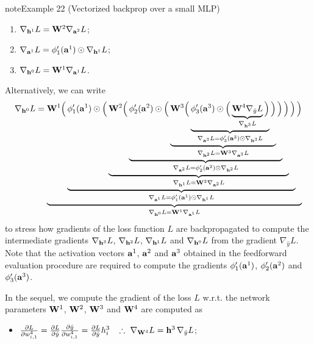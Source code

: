 \documentclass[letterpaper,10pt,english]{jupyterBook}
\begin{document}
\begin{sphinxadmonition}{note}{Example 22 (Vectorized backprop over a small MLP)}
\begin{enumerate}
\item {} 
\sphinxAtStartPar
\(\nabla_{{\bf h}^1} L = \mathbf{W}^2 \nabla_{\mathbf{a}^2} L\);

\item {} 
\sphinxAtStartPar
\(\nabla_{\mathbf{a}^1} L = \phi_{1}'(\mathbf{a}^1) \odot \nabla_{{\bf h}^1} L\);

\item {} 
\sphinxAtStartPar
\(\nabla_{{\bf h}^0} L = \mathbf{W}^1 \nabla_{\mathbf{a}^1} L\).

\end{enumerate}

\sphinxAtStartPar
Alternatively, we can write
\begin{equation*}
\begin{split}
\nabla_{{\bf h}^0} L = \underbrace{\mathbf{W}^1 \Big( 
\underbrace{\phi_{1}'(\mathbf{a}^1) \odot \Big(
\underbrace{\mathbf{W}^2 \Big( 
\underbrace{\phi_{2}'(\mathbf{a}^2) \odot \Big(
\underbrace{\mathbf{W}^3 \Big(
\underbrace{\phi_{3}'(\mathbf{a}^3) \odot \Big(
\underbrace{\mathbf{W}^4 \nabla_{\hat{y}} L}_{\nabla_{{\bf h}^3} L}
\Big)}_{\nabla_{\mathbf{a}^3} L = \phi_{3}'(\mathbf{a}^3) \odot \nabla_{{\bf h}^3} L}
\Big)}_{\nabla_{{\bf h}^2} L = \mathbf{W}^3 \nabla_{\mathbf{a}^3} L}
\Big)}_{\nabla_{\mathbf{a}^2} L = \phi_{2}'(\mathbf{a}^2) \odot \nabla_{{\bf h}^2} L}
\Big)}_{\nabla_{{\bf h}^1} L = \mathbf{W}^2 \nabla_{\mathbf{a}^2} L}
\Big)}_{\nabla_{\mathbf{a}^1} L = \phi_{1}'(\mathbf{a}^1) \odot \nabla_{{\bf h}^1} L}
\Big)}_{\nabla_{{\bf h}^0} L = \mathbf{W}^1 \nabla_{\mathbf{a}^1} L}
\end{split}
\end{equation*}
to stress how gradients of the loss function \(L\) are backpropagated to compute the intermediate gradients \( \nabla_{{\bf h}^3} L \), \( \nabla_{{\bf h}^2} L\), \( \nabla_{{\bf h}^1} L \) and \( \nabla_{{\bf h}^0} L \) from the gradient \(\nabla_{\hat{y}} L\). Note that the activation vectors \( {\bf a}^{1} \), \( {\bf a}^{2} \) and \( {\bf a}^{3} \) obtained in the feedforward evaluation procedure are required to compute the gradients \( \phi_{1}'({\bf a}^{1}) \), \( \phi_{2}'({\bf a}^{2}) \) and \( \phi_{3}'({\bf a}^{3}) \).

\sphinxAtStartPar
In the sequel, we compute the gradient of the loss \(L\) w.r.t. the network parameters \( {\bf W}^{1} \), \( {\bf W}^{2} \), \( {\bf W}^{3} \) and \( {\bf W}^{4} \) are computed as
\begin{itemize}
\item {} 
\sphinxAtStartPar
\( {\partial L \over \partial w_{i,1}^{4}} = {\partial L \over \partial \hat{y}} {\partial \hat{y} \over \partial w_{i,1}^{4}} = {\partial L \over \partial \hat{y}} h_{i}^{3} \,\,\,\,\,\therefore\,\, \nabla_{{\bf W}^{4}} L = {\bf h}^{3} \, \nabla_{\hat{y}} L\);


\end{itemize}
\end{sphinxadmonition}
\end{document}
